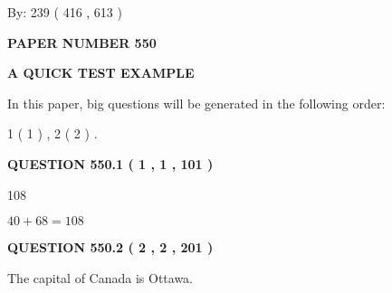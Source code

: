 \documentclass[12pt]{article}
\begin{document}
   
\hspace{1.0in} By: 
 239 ( 416 ,  613 )
   
   
   
   
\newpage 
\setcounter{page}{ 
   550001 } 
   
   
   
   
 {\textbf{ \Large{ PAPER NUMBER  550  }}}
   
   
\vspace{0.2in}
   
   
   
   
   
   
 \vspace{0.2in}
{\LARGE {\textbf{ A QUICK TEST EXAMPLE}}}
   
   
   
\vspace{0.2in}
   
In this paper, big questions will be generated in the following order: 
   
   
   1 ( 1 )
 ,
   2 ( 2 )
 .
  
\vspace{0.2in}
  
{\textbf{\Large{QUESTION
550.1 
 ( 1 , 1 , 101 )
}}}
  
  
 
 
\noindent{}

108
 
 
 
 
\noindent{}

$ %
40 +  %
68=   %
108$
 
 
  
\vspace{0.2in}
  
{\textbf{\Large{QUESTION
550.2 
 ( 2 , 2 , 201 )
}}}
  
  
 
 
\noindent{}
 
 
The capital of Canada is Ottawa.
 
 
 
 
   
   
 \vspace{0.2in}
 
\end{document}
